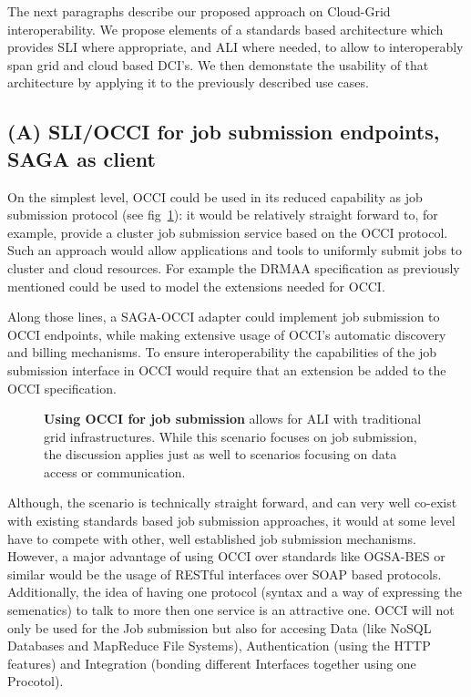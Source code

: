 \documentclass[10pt,conference,final,letterpaper,twoside,twocolumn,]{IEEEtran}
\newcommand{\B}[1]{\textbf{#1}}
\begin{document}
 The next paragraphs describe our proposed approach on Cloud-Grid
 interoperability. We propose elements of a standards based
 architecture which provides SLI where appropriate, and ALI where
 needed, to allow to interoperably span grid and cloud based DCI's.
 We then demonstate the usability of that architecture by applying it
 to the previously described use cases.
 
 \subsection{(A) SLI/OCCI for job submission endpoints, SAGA as client}
 
 On the simplest level, OCCI could be used in its reduced capability
 as job submission protocol (see fig~\ref{fig:arch1}): it would be
 relatively straight forward to, for example, provide a cluster job
 submission service based on the OCCI protocol. Such an approach would
 allow applications and tools to uniformly submit jobs to cluster and
 cloud resources. For example the DRMAA specification as previously
 mentioned could be used to model the extensions needed for OCCI.
 
 Along those lines, a SAGA-OCCI adapter could implement job submission
 to OCCI endpoints, while making extensive usage of OCCI's automatic
 discovery and billing mechanisms. To ensure interoperability the
 capabilities of the job submission interface in OCCI would require
 that an extension be added to the OCCI specification.
 
 \begin{figure}[h!]
  \caption{\footnotesize\label{fig:arch1} \B{Using OCCI for job 
     submission} allows for ALI with traditional grid infrastructures.  
     While this scenario focuses on job submission, the discussion 
     applies just as well to scenarios focusing on data access or 
     communication.}
 \end{figure}
 
 Although, the scenario is technically straight forward, and can very
 well co-exist with existing standards based job submission
 approaches, it would at some level have to compete with other, well
 established job submission mechanisms. However, a major advantage of
 using OCCI over standards like OGSA-BES or similar would be the usage
 of RESTful interfaces over SOAP based protocols. Additionally, the
 idea of having one protocol (syntax and a way of expressing the
 semenatics) to talk to more then one service is an attractive
 one. OCCI will not only be used for the Job submission but also for
 accesing Data (like NoSQL Databases and MapReduce File Systems),
 Authentication (using the HTTP features) and Integration (bonding
 different Interfaces together using one Procotol).
\end{document}
